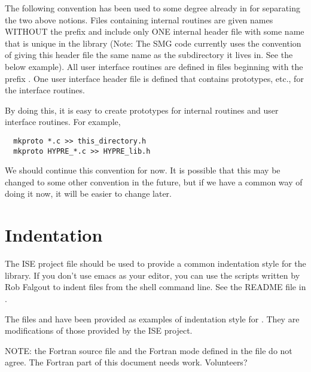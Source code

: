 The following convention has been used to some degree already in
\hypre{} for separating the two above notions.  Files containing
internal routines are given names WITHOUT the  prefix and
include only ONE internal header file with some name that is unique in
the \hypre{} library (Note: The SMG code currently uses the convention
of giving this header file the same name as the subdirectory it lives
in.  See the below example).  All user interface routines are defined
in files beginning with the prefix .  One user interface
header file is defined that contains prototypes, etc., for the
interface routines.

By doing this, it is easy to create prototypes for internal routines and
user interface routines.  For example,
\begin{verbatim}
  mkproto *.c >> this_directory.h
  mkproto HYPRE_*.c >> HYPRE_lib.h
\end{verbatim}

We should continue this convention for now.  It is possible that this
may be changed to some other convention in the future, but if we have
a common way of doing it now, it will be easier to change later.

\section{Indentation}
\label{Indentation}

The ISE project file  should be used to provide a common
indentation style for the library.  If you don't use emacs as your
editor, you can use the scripts written by Rob Falgout to indent files
from the shell command line.  See the README file in .

The files  and  have
been provided as examples of indentation style for \hypre{}.  They are
modifications of those provided by the ISE project.

NOTE: the Fortran source file and the Fortran mode defined in
the  file do not agree.  The Fortran part of this
document needs work.  Volunteers?


